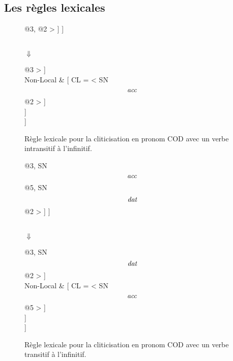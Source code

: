 \newpage
\subsection{Les règles lexicales}

\begin{figure}[ht]
\centering
\begin{avm}
  [{}
    phon         & </\emph{fait}/> \\
    synsem = Cat & [{} Sous-cat = < SN @{1}, V[{}
						TRANS & -\\
						Sous-cat & < SN @{2}> $\oplus$ @{4} ] @{3}, @{2} >
					      ]
  ]
\end{avm}\\
$\Downarrow$\\
\begin{avm}
  [{}
    phon   & </\emph{le-fait}/> \\
    synsem & [{}
	      Local = Cat & [{} Sous-cat = < SN @{1}, V [{}
						          TRANS    & -\\
							  Sous-cat & @{4}
							] @{3} > ]\\
	      Non-Local   & [{} CL = < SN\[\emph{acc}\] @{2} > ]\\
             ]\\
  ]
\end{avm}
\caption{Règle lexicale pour la cliticisation en pronom COD avec un verbe intransitif à l'infinitif.\label{regle.cl.cod}}
\end{figure}

\begin{figure}[ht]
\centering
\begin{avm}
  [{}
    phon         & </\emph{fait}/> \\
    synsem = Cat & [{} Sous-cat = < SN @{1}, V[{}
						TRANS & +\\
						Sous-cat & < SN @{2}, SN\[\emph{acc}\] @{5}> $\oplus$ @{4} ] @{3}, SN\[\emph{acc}\] @{5}, SN\[\emph{dat}\] @{2} >
					      ]
  ]
\end{avm}\\
$\Downarrow$\\
\begin{avm}
  [{}
    phon   & </\emph{le-fait}/> \\
    synsem & [{}
	      Local = Cat & [{} Sous-cat = < SN @{1}, V [{}
						          TRANS    & +\\
							  Sous-cat & < SN\[\emph{acc}\] @{5} > $\oplus$ @{4}
							] @{3}, SN\[\emph{dat}\] @{2} > ]\\
	      Non-Local   & [{} CL = < SN\[\emph{acc}\] @{5} > ]\\
             ]\\
  ]
\end{avm}
\caption{Règle lexicale pour la cliticisation en pronom COD avec un verbe transitif à l'infinitif.\label{regle.cl.cod.trans}}
\end{figure}

